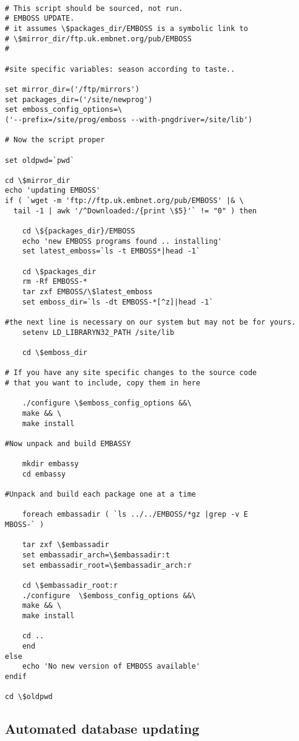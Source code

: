 \documentclass{report}
\begin{document}
\begin{verbatim}

# This script should be sourced, not run.
# EMBOSS UPDATE.
# it assumes \$packages_dir/EMBOSS is a symbolic link to 
# \$mirror_dir/ftp.uk.embnet.org/pub/EMBOSS
#

#site specific variables: season according to taste..

set mirror_dir=('/ftp/mirrors')
set packages_dir=('/site/newprog')
set emboss_config_options=\
('--prefix=/site/prog/emboss --with-pngdriver=/site/lib')

# Now the script proper

set oldpwd=`pwd`

cd \$mirror_dir
echo 'updating EMBOSS'
if ( `wget -m 'ftp://ftp.uk.embnet.org/pub/EMBOSS' |& \
  tail -1 | awk '/^Downloaded:/{print \$5}'` != "0" ) then 

    cd \${packages_dir}/EMBOSS
    echo 'new EMBOSS programs found .. installing'
    set latest_emboss=`ls -t EMBOSS*|head -1`

    cd \$packages_dir
    rm -Rf EMBOSS-*
    tar zxf EMBOSS/\$latest_emboss
    set emboss_dir=`ls -dt EMBOSS-*[^z]|head -1`

#the next line is necessary on our system but may not be for yours.
    setenv LD_LIBRARYN32_PATH /site/lib

    cd \$emboss_dir

# If you have any site specific changes to the source code 
# that you want to include, copy them in here

    ./configure \$emboss_config_options &&\
    make && \
    make install

#Now unpack and build EMBASSY

    mkdir embassy
    cd embassy

#Unpack and build each package one at a time

    foreach embassadir ( `ls ../../EMBOSS/*gz |grep -v E
MBOSS-` )

	tar zxf \$embassadir
	set embassadir_arch=\$embassadir:t
	set embassadir_root=\$embassadir_arch:r

	cd \$embassadir_root:r
	./configure  \$emboss_config_options &&\
	make && \
	make install

	cd ..
    end
else
    echo 'No new version of EMBOSS available'
endif

cd \$oldpwd
\end{verbatim} 

\subsection{Automated database updating}
\end{document}

